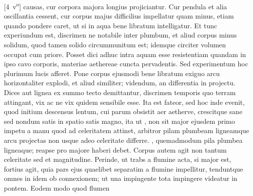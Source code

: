 [4~v\textsuperscript{o}] causas, cur corpora majora longius projiciantur. Cur pendula\protect{} et alia oscillantia cessent, cur corpus majus difficilius impellatur quam minus, etiam quando pondere caret, ut si in aqua bene libratum intelligatur. Et tunc experiundum est, discrimen ne notabile inter plumbum\protect{}, et aliud corpus minus solidum, quod tamen solido circummunitum est; idemque circiter volumen occupat cum priore. Posset dici adhuc intra aquam esse resistentiam\protect{} quandam in ipso cavo corporis, materiae aethereae\protect{} cuncta pervadentis. Sed experimentum hoc plurimum lucis afferet. Pone corpus ejusmodi bene libratum exiguo arcu\protect{} horizontaliter explodi, et aliud similiter; videndum, an differentia in projectu. Dices   aut lignea ex summo tecto  demittantur, discrimen temporis quo terram attingant, vix ac ne vix quidem sensibile esse. Ita est fateor, sed hoc inde evenit, quod initium descensus lentum, cui parum obsistit aer aetherve\protect{}, crescitque sane sed nondum satis in spatio  satis magno, ita ut , non sit  major ejusdem primo impetu\protect{} a manu  quod ad celeritatem\protect{} attinet, arbitror pilam\protect{} plumbeam ligneamque arcu\protect{} projectas non usque adeo celeritate\protect{} differre. , quemadmodum pila\protect{} plumbea ligneaque;  reapse pro majore haberi debet. Corpus autem agit non tantum celeritate\protect{} sed et magnitudine. Perinde, ut trabs\protect{} a flumine acta, si major est, fortius agit, quia pars ejus quaelibet separatim a flumine impellitur, tenduntque omnes in idem ob connexionem; ut una impingente tota impingere videatur in pontem. Eodem modo quod flumen 